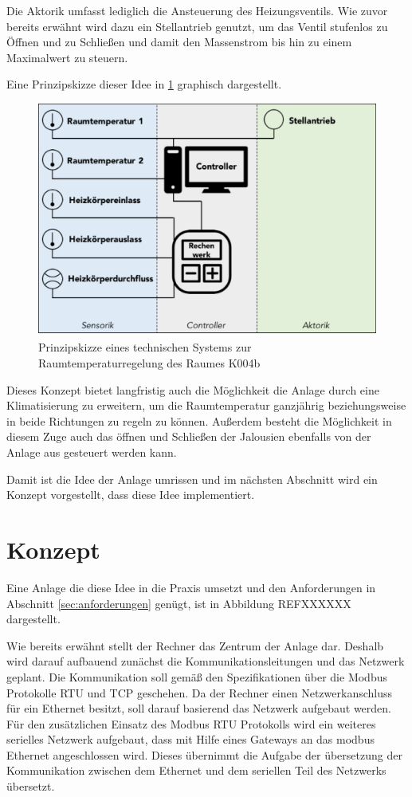 Die Aktorik umfasst lediglich die Ansteuerung des Heizungsventils. Wie zuvor bereits erwähnt wird dazu ein Stellantrieb genutzt, um das Ventil stufenlos zu Öffnen und zu Schließen und damit den Massenstrom bis hin zu einem Maximalwert zu steuern. 

Eine Prinzipskizze dieser Idee in \ref{fig:konzept} graphisch dargestellt.

\begin{figure}
\centering
\includegraphics[width=\textwidth]{abbildungen/20160318_Konzept}
\caption{Prinzipskizze eines technischen Systems zur Raumtemperaturregelung des Raumes K004b}
\label{fig:konzept}
\end{figure}


Dieses Konzept bietet langfristig auch die Möglichkeit die Anlage durch eine Klimatisierung zu erweitern, um die Raumtemperatur ganzjährig beziehungsweise in beide Richtungen zu regeln zu können. Außerdem besteht die Möglichkeit in diesem Zuge auch das öffnen und Schließen der Jalousien ebenfalls von der Anlage aus gesteuert werden kann.

Damit ist die Idee der Anlage umrissen und im nächsten Abschnitt wird ein Konzept vorgestellt, dass diese Idee implementiert.

\section{Konzept}

Eine Anlage die diese Idee in die Praxis umsetzt und den Anforderungen in Abschnitt \ref{sec:anforderungen} genügt, ist in Abbildung REFXXXXXX dargestellt.


Wie bereits erwähnt stellt der Rechner das Zentrum der Anlage dar. Deshalb wird darauf aufbauend zunächst die Kommunikationsleitungen und das Netzwerk geplant. Die Kommunikation soll gemäß den Spezifikationen über die Modbus Protokolle RTU und TCP geschehen. Da der Rechner einen Netzwerkanschluss für ein Ethernet besitzt, soll darauf basierend das Netzwerk aufgebaut werden. Für den zusätzlichen Einsatz des Modbus RTU Protokolls wird ein weiteres serielles Netzwerk aufgebaut, dass mit Hilfe eines Gateways an das modbus Ethernet angeschlossen wird. Dieses übernimmt die Aufgabe der übersetzung der Kommunikation zwischen dem Ethernet und dem seriellen Teil des Netzwerks übersetzt.

